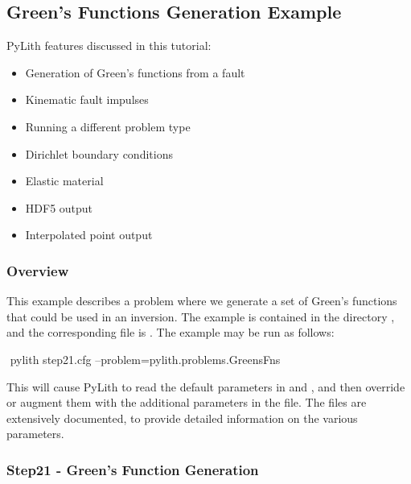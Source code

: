 \subsection{Green's Functions Generation Example}
\label{sec:example:3dhex8:greensfns}

PyLith features discussed in this tutorial:
\begin{itemize}
\item Generation of Green's functions from a fault
\item Kinematic fault impulses
\item Running a different problem type
\item Dirichlet boundary conditions
\item Elastic material
\item HDF5 output
\item Interpolated point output
\end{itemize}

\subsubsection{Overview}

This example describes a problem where we generate a set of Green's
functions that could be used in an inversion. The example is contained
in the directory , and the corresponding
 file is . The example may be run
as follows:
\begin{shell}
$$ pylith step21.cfg --problem=pylith.problems.GreensFns
\end{shell}
This will cause PyLith to read the default parameters in
 and , and then
override or augment them with the additional parameters in the
 file. The  files are extensively
documented, to provide detailed information on the various parameters.


\subsubsection{Step21 - Green's Function Generation}

